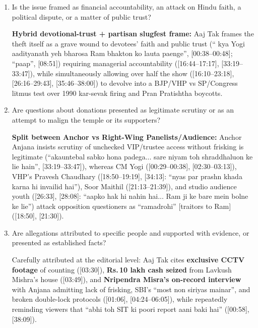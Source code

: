 \documentclass[10pt,a4paper]{article}
\begin{document}
\begin{enumerate}[leftmargin=1.5em, itemsep=6pt, topsep=4pt]
  \textbf{Donors:} Revered as ``karodon arbon bhakton'' ([02:19]) who made ``samarpan'' [sacred offering, not mere chanda] ([17:17--17:25]).

  \textbf{People Making Allegations:} Introduced through an electoral-partisan lens (``vipaksh bhi is mudde ko bada bana raha hai aur BJP ko is mauke par gher raha hai'', [00:20--00:29]), citing SP ex-minister Pawan Pandey, Akhilesh Yadav's June 7 X post ([06:13--06:21]), and Faizabad MP Awadhesh Prasad ([01:06--01:16], [06:32--07:46]), whom the Aaj Tak reporter pointedly quizzes on why Akhilesh Yadav hasn't visited Ayodhya Ram Mandir ([07:10--07:46], echoed by Anjana at [16:10--16:20], [26:52--27:10]).
  \item Is the issue framed as financial accountability, an attack on Hindu faith, a political dispute, or a matter of public trust?\par\smallskip
  \textbf{Hybrid devotional-trust + partisan slugfest frame:} Aaj Tak frames the theft itself as a grave wound to devotees' faith and public trust (`` kya Yogi aadityanath yeh bharosa Ram bhakton ko lauta paenge'', [00:38--00:48]; ``paap'', [08:51]) requiring managerial accountability ([16:44--17:17], [33:19--33:47]), while simultaneously allowing over half the show ([16:10--23:18], [26:16--29:43], [35:46--38:00]) to devolve into a BJP/VHP vs SP/Congress litmus test over 1990 kar-sevak firing and Pran Pratishtha boycotts.
  \item Are questions about donations presented as legitimate scrutiny or as an attempt to malign the temple or its supporters?\par\smallskip
  \textbf{Split between Anchor vs Right-Wing Panelists/Audience:} Anchor Anjana insists scrutiny of unchecked VIP/trustee access without frisking is legitimate (``akauntebal sabko hona padega... sare niyam toh shraddhaluon ke lie hain'', [33:19--33:47]), whereas CM Yogi ([00:29--00:38], [02:30--03:13]), VHP's Pravesh Chaudhary ([18:50--19:19], [34:13]: ``nyas par prashn khada karna hi invailid hai''), Soor Maithil ([21:13--21:39]), and studio audience youth ([26:33], [28:08]: ``aapko hak hi nahin hai... Ram ji ke bare mein bolne ke lie'') attack opposition questioners as ``ramadrohi'' [traitors to Ram] ([18:50], [21:30]).
  \item Are allegations attributed to specific people and supported with evidence, or presented as established facts?\par\smallskip
  Carefully attributed at the editorial level: Aaj Tak cites \textbf{exclusive CCTV footage} of counting ([03:30]), \textbf{Rs.\,10 lakh cash seized} from Lavkush Mishra's house ([03:49]), and \textbf{Nripendra Misra's on-record interview} with Anjana admitting lack of frisking, SBI's ``most non siriyas mainar'', and broken double-lock protocols ([01:06], [04:24--06:05]), while repeatedly reminding viewers that ``abhi toh SIT ki poori report aani baki hai'' ([00:58], [38:09]).

\end{enumerate}
\end{document}
